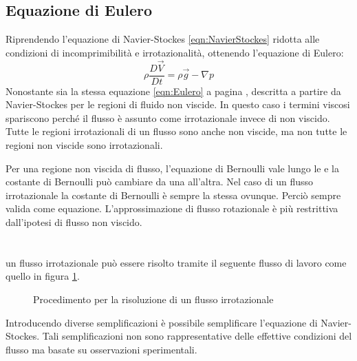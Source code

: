 \subsection{Equazione di Eulero}
Riprendendo l'equazione di Navier-Stockes \eqref{eqn:NavierStockes} ridotta alle condizioni di incomprimibilità e irrotazionalità, ottenendo l'equazione di Eulero:
\begin{equation}
\rho \frac{D\vec{V}}{Dt} = \rho\vec{g} - \nabla p
\label{eqn:EulerianEquation}
\end{equation}
Nonostante sia la stessa equazione \eqref{eqn:Eulero} a pagina \pageref{eqn:Eulero}, descritta a partire da Navier-Stockes per le regioni di fluido non viscide.
In questo caso i termini viscosi spariscono perché il flusso è assunto come irrotazionale invece di non viscido.
Tutte le regioni irrotazionali di un flusso sono anche non viscide, ma non tutte le regioni non viscide sono irrotazionali.

Per una regione non viscida di flusso, l'equazione di Bernoulli vale lungo le  e la costante di Bernoulli può cambiare da una  all'altra.
Nel caso di un flusso irrotazionale la costante di Bernoulli è sempre la stessa ovunque. Perciò sempre valida come equazione.
L'approssimazione di flusso rotazionale è più restrittiva dall'ipotesi di flusso non viscido.

\section*{}
un flusso irrotazionale può essere risolto tramite il seguente flusso di lavoro come quello in figura \ref{fig:IrrotationalFlow}.

\begin{figure}
\centering
{}
\caption{Procedimento per la risoluzione di un flusso irrotazionale}
\label{fig:IrrotationalFlow}
\end{figure}
Introducendo diverse semplificazioni è possibile semplificare l'equazione di Navier-Stockes. Tali semplificazioni non sono rappresentative delle effettive condizioni del flusso ma basate su osservazioni sperimentali.

